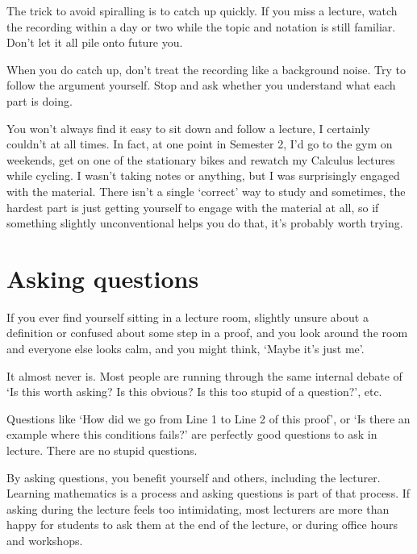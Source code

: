 The trick to avoid spiralling is to catch up quickly. If you miss a lecture, watch the recording within a day or two while the topic and notation is still familiar. Don't let it all pile onto future you.  


When you do catch up, don't treat the recording like a background noise. Try to follow the argument yourself. Stop and ask whether you understand what each part is doing. 

You won't always find it easy to sit down and follow a lecture, I certainly couldn't at all times. In fact, at one point in Semester 2, I'd go to the gym on weekends, get on one of the stationary bikes and rewatch my Calculus lectures while cycling. I wasn't taking notes or anything, but I was surprisingly engaged with the material. There isn't a single `correct' way to study and sometimes, the hardest part is just getting yourself to engage with the material at all, so if something slightly unconventional helps you do that, it's probably worth trying. 

\section{Asking questions}

If you ever find yourself sitting in a lecture room, slightly unsure about a definition or confused about some step in a proof, and you look around the room and everyone else looks calm, and you might think, `Maybe it's just me'. 

It almost never is. Most people are running through the same internal debate of `Is this worth asking? Is this obvious? Is this too stupid of a question?', etc. 

Questions like `How did we go from Line 1 to Line 2 of this proof', or `Is there an example where this conditions fails?' are perfectly good questions to ask in lecture. There are no stupid questions. 

By asking questions, you benefit yourself and others, including the lecturer. Learning mathematics is a process and asking questions is part of that process. If asking during the lecture feels too intimidating, most lecturers are more than happy for students to ask them at the end of the lecture, or during office hours and workshops. 

